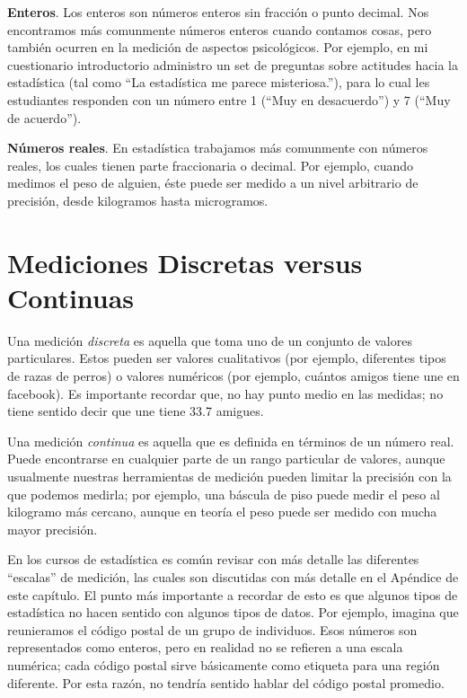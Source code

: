 \documentclass[
  12pt,
]{book}
\begin{document}
\textbf{Enteros}. Los enteros son números enteros sin fracción o punto decimal. Nos encontramos más comunmente números enteros cuando contamos cosas, pero también ocurren en la medición de aspectos psicológicos. Por ejemplo, en mi cuestionario introductorio administro un set de preguntas sobre actitudes hacia la estadística (tal como ``La estadística me parece misteriosa.''), para lo cual les estudiantes responden con un número entre 1 (``Muy en desacuerdo'') y 7 (``Muy de acuerdo'').

\textbf{Números reales}. En estadística trabajamos más comunmente con números reales, los cuales tienen parte fraccionaria o decimal. Por ejemplo, cuando medimos el peso de alguien, éste puede ser medido a un nivel arbitrario de precisión, desde kilogramos hasta microgramos.

\hypertarget{mediciones-discretas-versus-continuas}{%
\section{Mediciones Discretas versus Continuas}\label{mediciones-discretas-versus-continuas}}

Una medición \emph{discreta} es aquella que toma uno de un conjunto de valores particulares. Estos pueden ser valores cualitativos (por ejemplo, diferentes tipos de razas de perros) o valores numéricos (por ejemplo, cuántos amigos tiene une en facebook). Es importante recordar que, no hay punto medio en las medidas; no tiene sentido decir que une tiene 33.7 amigues.

Una medición \emph{continua} es aquella que es definida en términos de un número real. Puede encontrarse en cualquier parte de un rango particular de valores, aunque usualmente nuestras herramientas de medición pueden limitar la precisión con la que podemos medirla; por ejemplo, una báscula de piso puede medir el peso al kilogramo más cercano, aunque en teoría el peso puede ser medido con mucha mayor precisión.

En los cursos de estadística es común revisar con más detalle las diferentes ``escalas'' de medición, las cuales son discutidas con más detalle en el Apéndice de este capítulo. El punto más importante a recordar de esto es que algunos tipos de estadística no hacen sentido con algunos tipos de datos. Por ejemplo, imagina que reunieramos el código postal de un grupo de individuos. Esos números son representados como enteros, pero en realidad no se refieren a una escala numérica; cada código postal sirve básicamente como etiqueta para una región diferente. Por esta razón, no tendría sentido hablar del código postal promedio.
\end{document}
